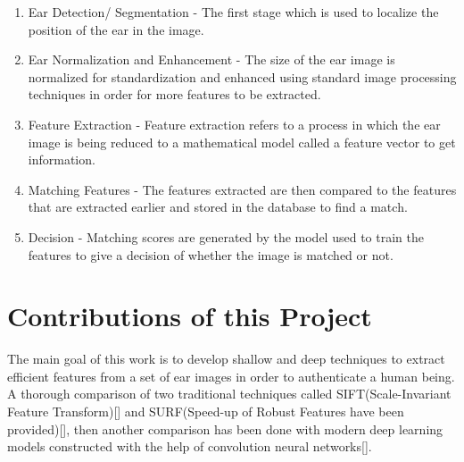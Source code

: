 \begin{enumerate}
\item Ear Detection/ Segmentation - The first stage which is used to localize the position of the ear in the image.
\item Ear Normalization and Enhancement - The size of the ear image is normalized for standardization and enhanced using standard image processing techniques in order for more features to be extracted.
\item Feature Extraction - Feature extraction refers to a process in which the ear image is being reduced to a mathematical model called a feature vector to get information.
\item Matching Features - The features extracted are then compared to the features that are extracted earlier and stored in the database to find a match.
\item Decision - Matching scores are generated by the model used to train the features to give a decision of whether the image is matched or not.
\end{enumerate}

\section{Contributions of this Project} The main goal of this work is to develop
shallow and deep techniques to extract efficient features from a set of ear images in order to authenticate a human being. A thorough comparison of two traditional techniques called SIFT(Scale-Invariant Feature Transform)[] and SURF(Speed-up of Robust Features have been provided)[], then another comparison has been done with modern deep learning models constructed with the help of convolution neural networks[].
